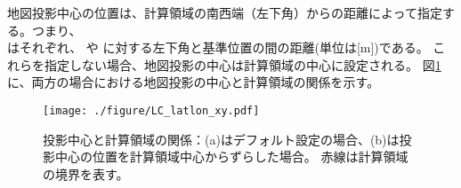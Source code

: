 \noindent
地図投影中心の位置は、計算領域の南西端（左下角）からの距離によって指定する。つまり、\\
はそれぞれ、
\XDIR や \YDIR に対する左下角と基準位置の間の距離(単位は[m])である。
これらを指定しない場合、地図投影の中心は計算領域の中心に設定される。
図\ref{fig:map_lc}に、両方の場合における地図投影の中心と計算領域の関係を示す。


\begin{figure}[t]
\begin{center}
  \texttt{[image: ./figure/LC\_latlon\_xy.pdf]}\\
  \caption{投影中心と計算領域の関係：(a)はデフォルト設定の場合、(b)は投影中心の位置を計算領域中心からずらした場合。
  赤線は計算領域の境界を表す。}
  \label{fig:map_lc}
\end{center}
\end{figure}
